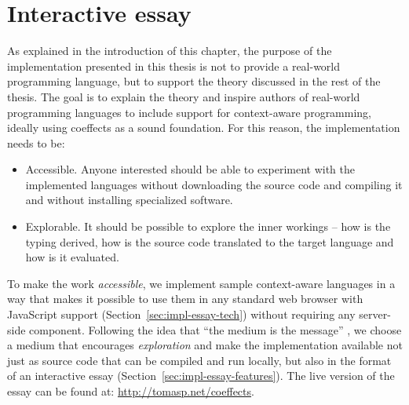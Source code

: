 
\section{Interactive essay}
\label{sec:impl-essay}

As explained in the introduction of this chapter, the purpose of the implementation presented in
this thesis is not to provide a real-world programming language, but to support the theory
discussed in the rest of the thesis. The goal is to explain the theory and inspire authors of
real-world programming languages to include support for context-aware programming, ideally using
coeffects as a sound foundation. For this reason, the implementation needs to be:

\begin{itemize}
\item {\sc Accessible.}  Anyone interested should be able to experiment with the implemented languages
  without downloading the source code and compiling it and without installing specialized software.

\item {\sc Explorable.}  It should be possible to explore the inner workings -- how is the typing
  derived, how is the source code translated to the target language and how is it evaluated.
\end{itemize}

\noindent
To make the work \emph{accessible}, we implement sample context-aware languages in a way that makes it
possible to use them in any standard web browser with JavaScript support (Section~\ref{sec:impl-essay-tech})
without requiring any server-side component. Following the idea that ``the medium is the message'' \cite{essay-medium},
we choose a medium that encourages \emph{exploration} and make the implementation available not just
as source code that can be compiled and run locally, but also in the format of
an interactive essay (Section~\ref{sec:impl-essay-features}). The live version of the essay can be
found at: \url{http://tomasp.net/coeffects}.



